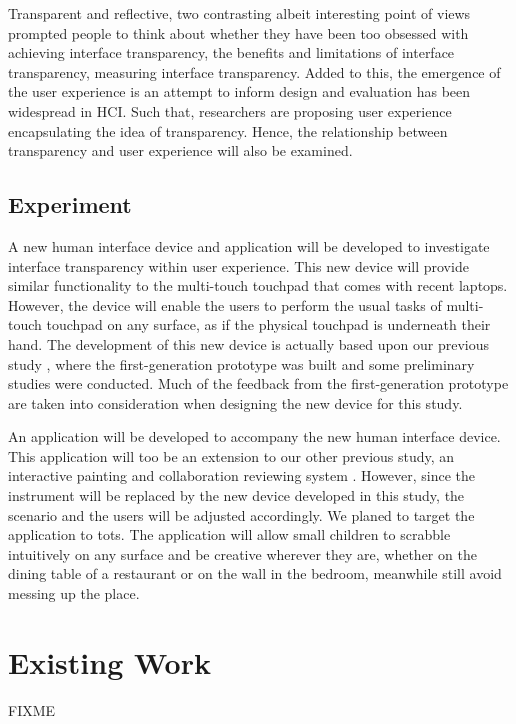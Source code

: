 \documentclass{acm_proc_article-sp}
\begin{document}
Transparent and reflective, two contrasting albeit interesting point
of views prompted people to think about whether they have been too
obsessed with achieving interface transparency, the benefits and
limitations of interface transparency, measuring interface
transparency. Added to this, the emergence of the user experience is
an attempt to inform design and evaluation has been widespread in
HCI. Such that, researchers are proposing user experience
encapsulating the idea of transparency. Hence, the relationship
between transparency and user experience will also be examined.

\subsection{Experiment}
A new human interface device and application will be developed to
investigate interface transparency within user experience. This new
device will provide similar functionality to the multi-touch touchpad
that comes with recent laptops. However, the device will enable the
users to perform the usual tasks of multi-touch touchpad on any
surface, as if the physical touchpad is underneath their hand. The
development of this new device is actually based upon our previous
study \citep{lmnt:huang}, where the first-generation prototype was
built and some preliminary studies were conducted. Much of the
feedback from the first-generation prototype are taken into
consideration when designing the new device for this study.

An application will be developed to accompany the new human interface
device. This application will too be an extension to our other
previous study, an interactive painting and collaboration reviewing
system \citep{baba:abeyrathne}. However, since the instrument will be
replaced by the new device developed in this study, the scenario and
the users will be adjusted accordingly. We planed to target the
application to tots. The application will allow small children to
scrabble intuitively on any surface and be creative wherever they are,
whether on the dining table of a restaurant or on the wall in the
bedroom, meanwhile still avoid messing up the place.



\section{Existing Work}
FIXME
\end{document}

